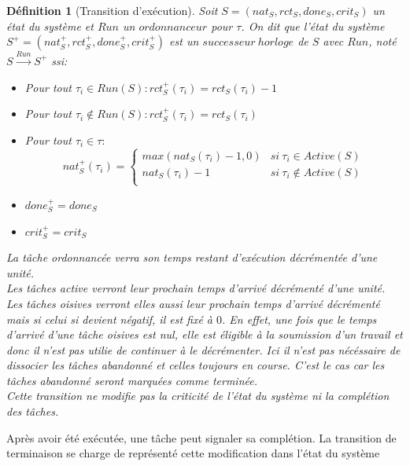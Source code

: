 \documentclass[12pt,a4paper,oneside]{book}
\theoremstyle{break}
\newtheorem{defin}{Définition}[chapter]
\theoremstyle{breakplain}
\begin{document}
\begin{defin}[Transition d'exécution]
\label{spo:texec}
Soit $S = (nat_S, rct_S, done_S, crit_S)$ un état du système et $Run$ un $ordonnanceur$ pour $\tau$. On dit que l'état du système $S^+ = (nat_S^+, rct_S^+, done_S^+, crit_S^+)$ est un $successeur\ horloge$ de $S$ avec $Run$, noté $S\xrightarrow{Run}S^+$ ssi:
\begin{itemize}
\item Pour tout $\tau_i \in Run(S) : rct_S^+(\tau_i) = rct_S(\tau_i)-1$\\
\item Pour tout $\tau_i \not \in Run(S) : rct_S^+(\tau_i) = rct_S(\tau_i)$\\
\item Pour tout $\tau_i \in \tau :$
$$ nat_S^+(\tau_i) = \left\{
    \begin{array}{ll}
        max(nat_S(\tau_i)-1, 0) & si\ \tau_i \in Active(S) \\
        nat_S(\tau_i)-1 & si\ \tau_i \notin Active(S) \\
    \end{array}
\right.
$$

\item $done_{S}^{+} = done_{S}$
\item $crit_{S}^{+} = crit_{S}$

\end{itemize}
La tâche ordonnancée verra son temps restant d'exécution décrémentée d'une unité.\\
Les tâches active verront leur prochain temps d'arrivé décrémenté d'une unité. Les tâches oisives verront elles aussi leur prochain temps d'arrivé décrémenté mais si celui si devient négatif, il est fixé à $0$. En effet, une fois que le temps d'arrivé d'une tâche oisives est nul, elle est éligible à la soumission d'un travail et donc il n'est pas utilie de continuer à le décrémenter. Ici il n'est pas nécéssaire de dissocier les tâches abandonné et celles toujours en course. C'est le cas car les tâches abandonné seront marquées comme terminée.\\
Cette transition ne modifie pas la criticité de l'état du système ni la complétion des tâches.
\end{defin}

Après avoir été exécutée, une tâche peut signaler sa complétion. La transition de terminaison se charge de représenté cette modification dans l'état du système
\end{document}
